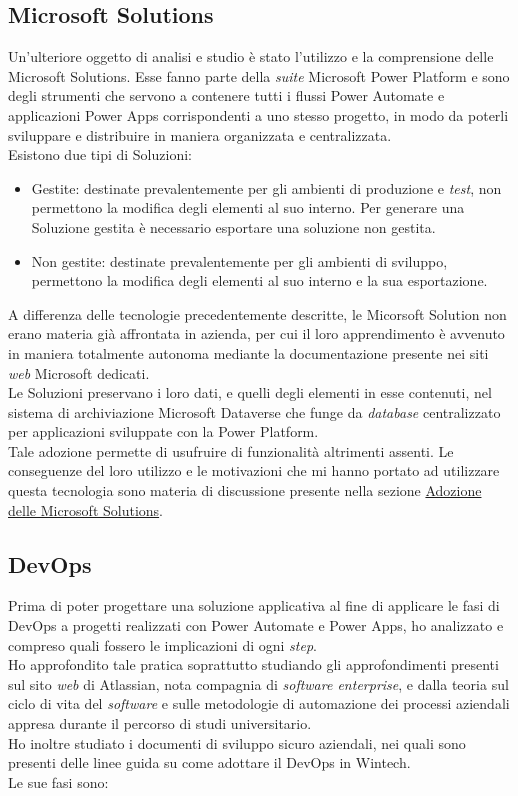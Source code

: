 \subsection{Microsoft Solutions}
Un'ulteriore oggetto di analisi e studio è stato l'utilizzo e la comprensione delle Microsoft Solutions. Esse fanno parte della \emph{suite} Microsoft Power Platform e sono degli strumenti che servono a contenere tutti i flussi Power Automate e applicazioni Power Apps corrispondenti a uno stesso progetto, in modo da poterli sviluppare e distribuire in maniera organizzata e centralizzata.\\
Esistono due tipi di Soluzioni: 
\begin{itemize}
    \item Gestite: destinate prevalentemente per gli ambienti di produzione e \emph{test}, non permettono la modifica degli elementi al suo interno. Per generare una Soluzione gestita è necessario esportare una soluzione non gestita.
    \item Non gestite: destinate prevalentemente per gli ambienti di sviluppo, permettono la modifica degli elementi al suo interno e la sua esportazione.
\end{itemize}
A differenza delle tecnologie precedentemente descritte, le Micorsoft Solution non erano materia già affrontata in azienda, per cui il loro apprendimento è avvenuto in maniera totalmente autonoma mediante la documentazione presente nei siti \emph{web} Microsoft dedicati.\\
Le Soluzioni preservano i loro dati, e quelli degli elementi in esse contenuti, nel sistema di archiviazione Microsoft Dataverse che funge da \emph{database} centralizzato per applicazioni sviluppate con la Power Platform.\\
Tale adozione permette di usufruire di funzionalità altrimenti assenti. Le conseguenze del loro utilizzo e le motivazioni che mi hanno portato ad utilizzare questa tecnologia sono materia di discussione presente nella sezione \hyperref[progettazioneSolutions]{Adozione delle Microsoft Solutions}.\\

\subsection{DevOps}
Prima di poter progettare una soluzione applicativa al fine di applicare le fasi di \gls{DevOps} a progetti realizzati con Power Automate e Power Apps, ho analizzato e compreso quali fossero le implicazioni di ogni \emph{step}.\\
Ho approfondito tale pratica soprattutto studiando gli approfondimenti presenti sul sito \emph{web} di Atlassian, nota compagnia di \emph{software enterprise}, e dalla teoria sul ciclo di vita del \emph{software} e sulle metodologie di automazione dei processi aziendali appresa durante il percorso di studi universitario.\\
Ho inoltre studiato i documenti di sviluppo sicuro aziendali, nei quali sono presenti delle linee guida su come adottare il \gls{DevOps} in Wintech.\\
Le sue fasi sono:
